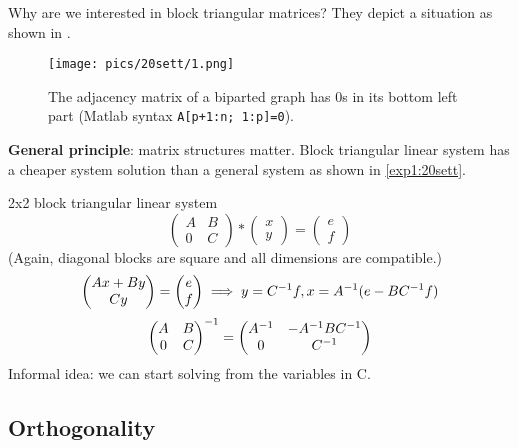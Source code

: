 \documentclass[computational_mathematics.tex]{subfiles}
\begin{document}
Why are we interested in block triangular matrices? They depict a situation as shown in .
\begin{figure}[H]
    \centering
    \texttt{[image: pics/20sett/1.png]}
    \caption{The adjacency matrix of a biparted graph has $0$s in its bottom left part (Matlab syntax \texttt{A[p+1:n; 1:p]=0}).}
    \label{fig:20sett3}
\end{figure}

\textbf{General principle}: matrix structures matter. Block triangular linear system has a cheaper system solution than a general system as shown in \cref{exp1:20sett}.
\begin{example}
\label{exp1:20sett}
2x2 block triangular linear system\\
$$
\begin{pmatrix}
    A & B\\
    0 & C
\end{pmatrix}*
\begin{pmatrix}
    x \\
    y 
\end{pmatrix} = 
\begin{pmatrix}
    e \\
    f 
\end{pmatrix}
$$
(Again, diagonal blocks are square and all dimensions are
compatible.)
$$
\begin{pmatrix}
    Ax + By\\
    Cy
\end{pmatrix} = 
\begin{pmatrix}
    e \\
    f 
\end{pmatrix}\implies y = {C}^{-1}f, x = {A}^{-1}(e - B{C}^{-1}f)
$$
$$
\begin{pmatrix}
    A & B\\
    0 & C
\end{pmatrix}^{-1} = 
\begin{pmatrix}
          {A}^{-1} & -{A}^{-1}B{C}^{-1}\\
          0 & {C}^{-1}
        \end{pmatrix}
$$
Informal idea: we can start solving from the variables in C.
\end{example}

\subsection{Orthogonality}
\end{document}

